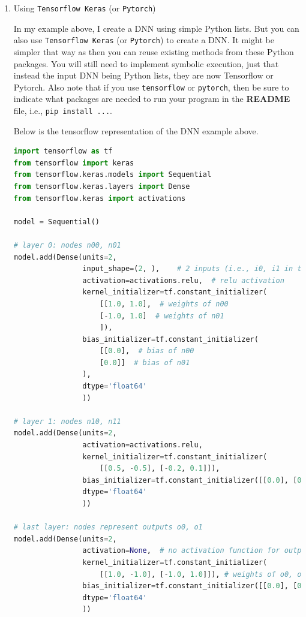 \begin{enumerate}[label=\arabic*.]
\item Using \texttt{Tensorflow Keras} (or \texttt{Pytorch})

In my example above, I create a DNN using simple Python lists.  But you can also use \texttt{Tensorflow Keras} (or \texttt{Pytorch}) to create a DNN.  It might be simpler that way as then you can reuse existing methods from these Python packages.  You will still need to implement symbolic execution, just that instead the input DNN being Python lists, they are now Tensorflow or Pytorch.  Also note that if you use \texttt{tensorflow} or \texttt{pytorch}, then be sure to indicate what packages are needed to run your program in the \textbf{README} file, i.e., \texttt{pip install ...}.

Below is the tensorflow representation of the DNN example above. 

\begin{lstlisting}[language=Python]
import tensorflow as tf
from tensorflow import keras
from tensorflow.keras.models import Sequential
from tensorflow.keras.layers import Dense
from tensorflow.keras import activations

model = Sequential()

# layer 0: nodes n00, n01
model.add(Dense(units=2,
                input_shape=(2, ),    # 2 inputs (i.e., i0, i1 in the Figure)
                activation=activations.relu,  # relu activation
                kernel_initializer=tf.constant_initializer(
                    [[1.0, 1.0],  # weights of n00
                    [-1.0, 1.0]  # weights of n01
                    ]),
                bias_initializer=tf.constant_initializer(
                    [[0.0],  # bias of n00
                    [0.0]]  # bias of n01
                ), 
                dtype='float64'
                ))

# layer 1: nodes n10, n11
model.add(Dense(units=2,
                activation=activations.relu,
                kernel_initializer=tf.constant_initializer(
                    [[0.5, -0.5], [-0.2, 0.1]]),
                bias_initializer=tf.constant_initializer([[0.0], [0.0]]),
                dtype='float64'
                ))

# last layer: nodes represent outputs o0, o1
model.add(Dense(units=2,
                activation=None,  # no activation function for output nodes
                kernel_initializer=tf.constant_initializer(
                    [[1.0, -1.0], [-1.0, 1.0]]), # weights of o0, o1
                bias_initializer=tf.constant_initializer([[0.0], [0.0]]),  # bias of o0, o1
                dtype='float64'
                ))
\end{lstlisting}
\end{enumerate}

